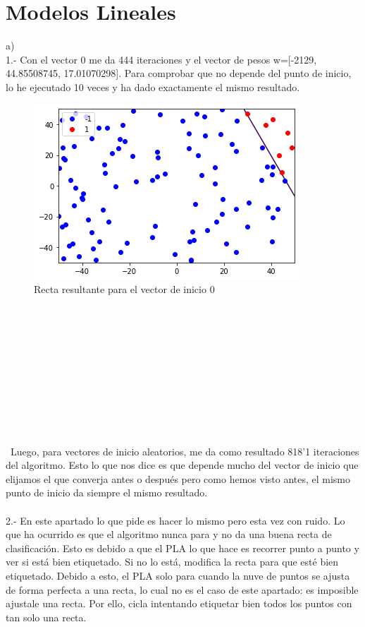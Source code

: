 \documentclass[12pt]{article}
\begin{document}
\section{Modelos Lineales}
a)\\
1.- Con el vector 0 me da 444 iteraciones y el vector de pesos w=[-2129, 44.85508745, 17.01070298]. Para comprobar que no depende del punto de inicio, lo he ejecutado 10 veces y ha dado exactamente el mismo resultado.
\begin{figure}[h]
\centering
\includegraphics[scale=0.75]{Images/Ej2a1.png} 
\caption{Recta resultante para el vector de inicio 0}
\label{etiqueta}
\end{figure}
\\\\\\\\\\\\\\\\\\\\\
Luego, para vectores de inicio aleatorios, me da como resultado 818'1 iteraciones del algoritmo. Esto lo que nos dice es que depende mucho del vector de inicio que elijamos el que converja antes o después pero como hemos visto antes, el mismo punto de inicio da siempre el mismo resultado.\\\\
2.- En este apartado lo que pide es hacer lo mismo pero esta vez con ruido. Lo que ha ocurrido es que el algoritmo nunca para y no da una buena recta de clasificación. Esto es debido a que el PLA lo que hace es recorrer punto a punto y ver si está bien etiquetado. Si no lo está, modifica la recta para que esté bien etiquetado. Debido a esto, el PLA solo para cuando la nuve de puntos se ajusta de forma perfecta a una recta, lo cual no es el caso de este apartado: es imposible ajustale una recta. Por ello, cicla intentando etiquetar bien todos los puntos con tan solo una recta.
\end{document}
